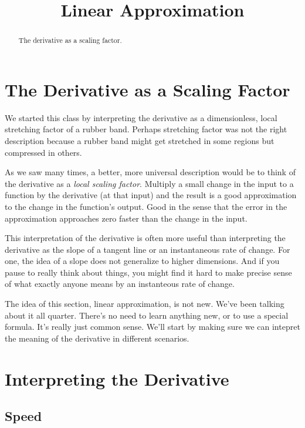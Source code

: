 \documentclass{ximera}
\title{Linear Approximation}
\begin{document}
\begin{abstract}
The derivative as a scaling factor.
\end{abstract}
\maketitle


\section{The Derivative as a Scaling Factor}

We started this class by interpreting the derivative as a dimensionless, local stretching factor of a rubber band. Perhaps stretching factor was not the right description because a rubber band might get stretched in some regions but compressed in others. 

As we saw many times, a better, more universal description would be to think of the derivative as a \emph{local scaling factor}. Multiply a small change in the input to a function by the derivative (at that input) and the result is a good approximation to the change in the function's output. Good in the sense that the error in the approximation approaches zero faster than the change in the input.

This interpretation of the derivative is often more useful than interpreting the derivative as the slope of a tangent line or an instantaneous rate of change. For one, the idea of a slope does not generalize to higher dimensions. And if you pause to really think about things, you might find it hard to make precise sense of what exactly anyone means by an instanteous rate of change. 

The idea of this section, linear approximation, is not new. We've been talking about it all quarter. There's no need to learn anything new, or to use a special formula. It's really just common sense. We'll start by making sure we can intepret the meaning of the derivative in different scenarios.%


\section{Interpreting the Derivative}

\subsection{Speed}
\end{document}
